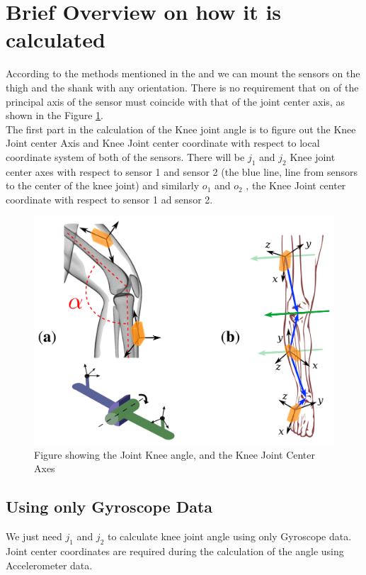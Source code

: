 \documentclass[12pt]{article}
\begin{document}
\section*{Brief Overview on how it is calculated}

According to the methods mentioned in the \cite{s140406891} and \cite{conf/IEEEcca/SeelSR12} we can mount the sensors on the thigh and the shank with any orientation. There is no requirement that on of the principal axis of the sensor must coincide with that of the joint center axis, as shown in the Figure \ref{kneeinfo}.\\
The first part in the calculation of the Knee joint angle is to figure out the Knee Joint center Axis and Knee Joint center coordinate with respect to local coordinate system of both of the sensors. There will be $ j_1 $ and $ j_2 $ Knee joint center axes with respect to sensor 1 and sensor 2 (the blue line, line from sensors to the center of the knee joint) and similarly $ o_1 $ and $ o_2 $ , the Knee Joint center coordinate with respect to sensor 1 ad sensor 2.\\


\begin{figure}[!htb]
\includegraphics[scale=2,center]{jointAxis.png}
\caption{Figure showing the Joint Knee angle, and the Knee Joint Center Axes}
\label{kneeinfo}
\end{figure}

\subsection*{Using only Gyroscope Data}
We just need $ j_1 $ and  $ j_2 $ to calculate knee joint angle using only  Gyroscope data. Joint center coordinates are required during the calculation of the angle using Accelerometer data.\\
\end{document}
